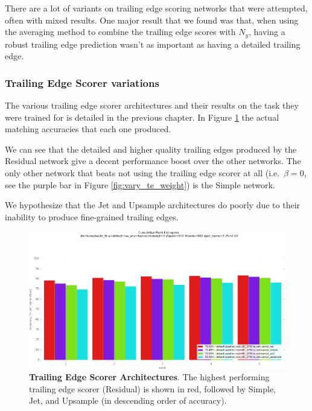 There are a lot of variants on trailing edge scoring networks that were attempted, often with mixed results. 
One major result that we found was that, when using the averaging method to combine the trailing edge scores with $N_y$, having a robust trailing edge prediction wasn't as important as having a detailed trailing edge.


\subsubsection{Trailing Edge Scorer variations}

The various trailing edge scorer architectures and their results on the task they were trained for is detailed in the previous chapter.
In Figure \ref{fig:vary_te_scorer} the actual matching accuracies that each one produced.

We can see that the detailed and higher quality trailing edges produced by the Residual network give a decent performance boost over the other networks.
The only other network that beats not using the trailing edge scorer at all (i.e.\ $\beta = 0$, see the purple bar in Figure \ref{fig:vary_te_weight}) is the Simple network.

We hypothesize that the Jet and Upsample architectures do poorly due to their inability to produce fine-grained trailing edges. %

\begin{figure}[t]%
\centering
\includegraphics[width=1\textwidth]{../images/results/vary_te_scorer.png}
\caption[]{\textbf{Trailing Edge Scorer Architectures}. The highest performing trailing edge scorer (Residual) is shown in red, followed by Simple, Jet, and Upsample (in descending order of accuracy).}
\label{fig:vary_te_scorer}
\end{figure}

